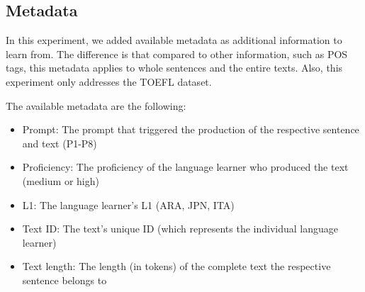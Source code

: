 \documentclass[11pt,a4paper]{article}
\begin{document}



%

\subsection{Metadata}
In this experiment, we added available metadata as additional information to learn from. The difference is that compared to other information, such as POS tags, this metadata applies to whole sentences and the entire texts. Also, this experiment only addresses the TOEFL dataset. 

The available metadata are the following:
\begin{itemize}
\item Prompt: The prompt that triggered the production of the respective sentence and text (P1-P8)
\item Proficiency: The proficiency of the language learner who produced the text (medium or high)
\item L1: The language learner's L1 (ARA, JPN, ITA)
\item Text ID: The text's unique ID (which represents the individual language learner)
\item Text length: The length (in tokens) of the complete text the respective sentence belongs to
\end{itemize}
\end{document}
